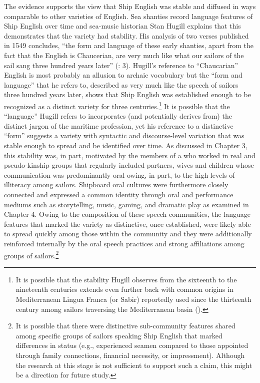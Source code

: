 The evidence supports the view that Ship English was stable and diffused in ways comparable to other varieties of English. Sea shanties record language features of Ship English over time and sea-music historian Stan Hugill explains that this demonstrates that the variety had stability. His analysis of two  verses published in 1549 concludes, “the form and language of these early shanties, apart from the fact that the English is Chaucerian, are very much like what our sailors of the sail sang three hundred years later” (\citealt{Hugill1969}: 3). Hugill’s reference to “Chaucarian” English is most probably an allusion to archaic vocabulary but the “form and language” that he refers to, described as very much like the speech of sailors three hundred years later, shows that Ship English was established enough to be recognized as a distinct variety for three centuries.\footnote{It is possible that the stability Hugill observes from the sixteenth to the nineteenth centuries extends even further back with common origins in Mediterranean Lingua Franca (or Sabir) reportedly used since the thirteenth century among sailors traversing the Mediterranean basin (\citealt{Parkvall2005}).}  It is possible that the “language” Hugill refers to incorporates (and potentially derives from) the distinct jargon of the maritime profession, yet his reference to a distinctive “form” suggests a variety with syntactic and discourse-level variation that was stable enough to spread and be identified over time. As discussed in Chapter 3, this stability was, in part, motivated by the members of a  who worked in real and pseudo-kinship groups that regularly included partners, wives and children whose communication was predominantly oral owing, in part, to the high levels of illiteracy among sailors. Shipboard oral cultures were furthermore closely connected and expressed a common identity through oral and performance mediums such as storytelling, music, gaming, and dramatic play as examined in Chapter 4. Owing to the composition of these speech communities, the language features that marked the variety as distinctive, once established, were likely able to spread quickly among those within the community and they were additionally reinforced internally by the oral speech practices and strong affiliations among groups of sailors.\footnote{It is possible that there were distinctive sub-community features shared among specific groups of sailors speaking Ship English that marked differences in status (e.g., experienced seamen compared to those appointed through family connections, financial necessity, or impressment). Although the research at this stage is not sufficient to support such a claim, this might be a direction for future study.}  

